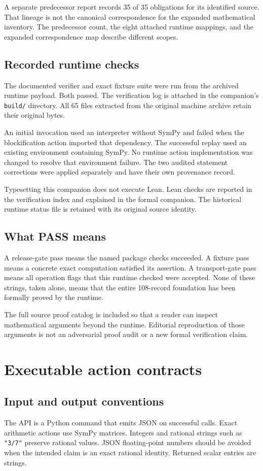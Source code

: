 \documentclass[a4paper,11pt]{article}
\begin{document}
A separate predecessor report records 35 of 35 obligations for its identified source. That lineage is not the canonical correspondence for the expanded mathematical inventory. The predecessor count, the eight attached runtime mappings, and the expanded correspondence map describe different scopes.
\subsection{Recorded runtime checks}
The documented verifier and exact fixture suite were run from the archived runtime payload. Both passed. The verification log is attached in the companion's \nolinkurl{build/} directory. All 65 files extracted from the original machine archive retain their original bytes.

An initial invocation used an interpreter without SymPy and failed when the blockification action imported that dependency. The successful replay used an existing environment containing SymPy. No runtime action implementation was changed to resolve that environment failure. The two audited statement corrections were applied separately and have their own provenance record.

Typesetting this companion does not execute Lean. Lean checks are reported in the verification index and explained in the formal companion. The historical runtime status file is retained with its original source identity.
\subsection{What PASS means}
A release-gate pass means the named package checks succeeded. A fixture pass means a concrete exact computation satisfied its assertion. A transport-gate pass means all operation flags that this runtime checked were accepted. None of these strings, taken alone, means that the entire 108-record foundation has been formally proved by the runtime.

The full source proof catalog is included so that a reader can inspect mathematical arguments beyond the runtime. Editorial reproduction of those arguments is not an adversarial proof audit or a new formal verification claim.

\section{Executable action contracts}
\subsection{Input and output conventions}
The API is a Python command that emits JSON on successful calls. Exact arithmetic actions use SymPy matrices. Integers and rational strings such as \nolinkurl{"3/7"} preserve rational values. JSON floating-point numbers should be avoided when the intended claim is an exact rational identity. Returned scalar entries are strings.
\end{document}
